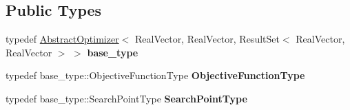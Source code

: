 \subsection*{Public Types}
\begin{DoxyCompactItemize}
\item 
typedef \hyperlink{classAbstractOptimizer}{Abstract\+Optimizer}$<$ Real\+Vector, Real\+Vector, Result\+Set$<$ Real\+Vector, Real\+Vector $>$ $>$ {\bfseries base\+\_\+type}\hypertarget{classAbstractPreselecter_a9d56c27fc2428c60a99dea0504717794}{}\label{classAbstractPreselecter_a9d56c27fc2428c60a99dea0504717794}

\item 
typedef base\+\_\+type\+::\+Objective\+Function\+Type {\bfseries Objective\+Function\+Type}\hypertarget{classAbstractPreselecter_ae3b0b31dee2296bb9ab385b80ac6a27e}{}\label{classAbstractPreselecter_ae3b0b31dee2296bb9ab385b80ac6a27e}

\item 
typedef base\+\_\+type\+::\+Search\+Point\+Type {\bfseries Search\+Point\+Type}\hypertarget{classAbstractPreselecter_a0b3b8c0fcb55a3f75337939d1cae182e}{}\label{classAbstractPreselecter_a0b3b8c0fcb55a3f75337939d1cae182e}

\end{DoxyCompactItemize}
